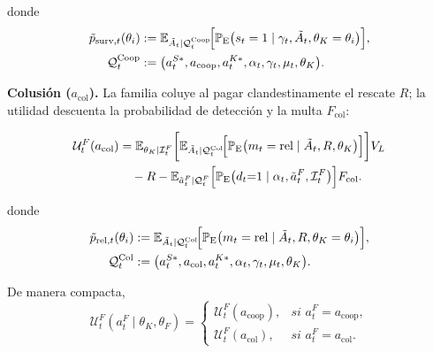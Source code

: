 \documentclass[12pt]{article}
\theoremstyle{definition}
\theoremstyle{remark}
\newcommand{\E}{\mathbb{E}}
\newcommand{\ProbE}{\mathbb{P}_{\mathrm{E}}}
\newcommand{\1}{\mathbf{1}}
\newcommand{\QtinfoF}{\mathcal{Q}_{t}^{F}}
\begin{document}
\noindent donde
\[
\begin{aligned}
\tilde p_{\mathrm{surv},t}(\theta_i)
&:=
\E_{\tilde A_t \mid \mathcal Q_t^{\mathrm{Coop}}}\!\Bigl[
\ProbE\bigl(s_t=1\mid \gamma_t,\tilde A_t,\theta_K=\theta_i\bigr)
\Bigr], \\
\mathcal Q_t^{\mathrm{Coop}}
&:=
\bigl(a_t^{S\ast},a_{\mathrm{coop}},a_t^{K\ast},\alpha_t,\gamma_t,\mu_t,\theta_K\bigr).
\end{aligned}
\]

\noindent \textbf{Colusión ($a_{\mathrm{col}}$).} La familia coluye al pagar clandestinamente el rescate $R$; la utilidad descuenta la probabilidad de detección y la multa $F_{\mathrm{col}}$:

\begin{equation}
    \label{eq:family-utility-col}
    \begin{split}
    \mathcal{U}^F_t(a_{\mathrm{col}})
    &=
    \E_{\theta_K \mid \mathcal{I}_t^F}
    \biggl[
    \E_{\tilde A_t \mid \mathcal Q_t^{\mathrm{Col}}}\!\Bigl[
      \ProbE\bigl(m_t=\mathrm{rel}\mid \tilde A_t,R,\theta_K\bigr)
    \Bigr]
    \biggr] V_L \\
    &\quad - R
    -\E_{\tilde{a}_t^F\mid\QtinfoF}\Bigl[
    \ProbE\bigl(d_t{=}1\mid\alpha_t,\tilde{a}_t^F,\mathcal{I}_t^F\bigr)
    \Bigr]F_{\mathrm{col}}.
    \end{split}
\end{equation}

\noindent donde
\[
\begin{aligned}
\tilde p_{\mathrm{rel},t}(\theta_i)
&:=
\E_{\tilde A_t \mid \mathcal Q_t^{\mathrm{Col}}}\!\Bigl[
\ProbE\bigl(m_t=\mathrm{rel}\mid \tilde A_t,R,\theta_K=\theta_i\bigr)
\Bigr], \\
\mathcal Q_t^{\mathrm{Col}}
&:=
\bigl(a_t^{S\ast},a_{\mathrm{col}},a_t^{K\ast},\alpha_t,\gamma_t,\mu_t,\theta_K\bigr).
\end{aligned}
\]

\noindent De manera compacta,
\begin{equation}
\label{eq:family-utility-general}
\mathcal{U}^F_t(a_t^F \mid \theta_K,\theta_F)
=
\begin{cases}
\mathcal{U}^F_t(a_{\mathrm{coop}}), & \textit{si } a_t^F = a_{\mathrm{coop}},\\
\mathcal{U}^F_t(a_{\mathrm{col}}), & \textit{si } a_t^F = a_{\mathrm{col}}.
\end{cases}
\end{equation}
\end{document}
